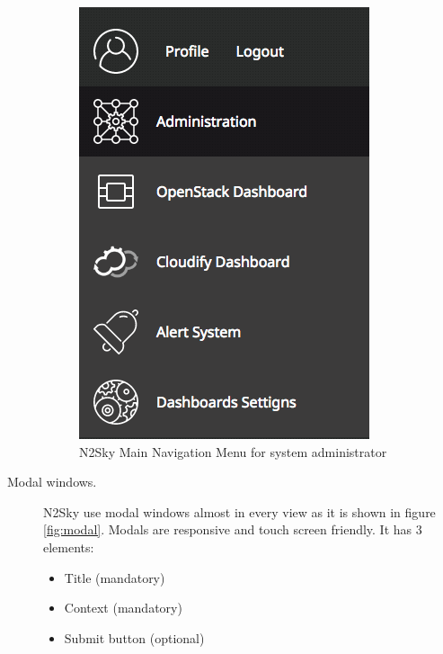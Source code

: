 \begin{description}
 \begin{figure}[htbp]
\begin{center}
  \includegraphics[scale=0.65]{components/3/components/menu_admin.png}
  \caption{N2Sky Main Navigation Menu for system administrator}
  \label{fig:menu_admin}
\end{center}
\end{figure}

\item[Modal windows.] N2Sky use modal windows almost in every view as it is shown in figure \ref{fig:modal}. Modals are responsive and touch screen friendly. It has 3 elements:
\begin{itemize}
\item Title (mandatory)
\item Context (mandatory)
\item Submit button (optional)
\end{itemize}


\end{description}
